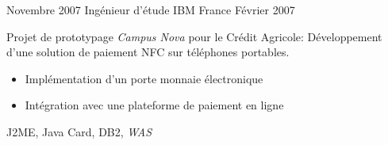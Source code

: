 \begin{experiences}
  \emptySeparator

  \experience
  {Novembre 2007}
  {Ingénieur d'étude}
  {IBM}
  {France}
  {Février 2007}
  {
    Projet de prototypage \emph{Campus Nova} pour le Crédit Agricole:
    Développement d'une solution de paiement NFC sur téléphones portables.
    \begin{itemize}
      \item Implémentation d'un porte monnaie électronique
      \item Intégration avec une plateforme de paiement en ligne
    \end{itemize}
  }
  {
    J2ME,
    Java Card,
    DB2,
    \emph{WAS}
  }
\end{experiences}
